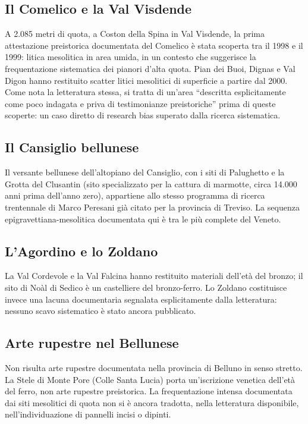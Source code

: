 \subsection{Il Comelico e la Val Visdende}

A 2.085 metri di quota, a Coston della Spina in Val Visdende, la prima attestazione preistorica documentata del Comelico è stata scoperta tra il 1998 e il 1999: litica mesolitica in area umida, in un contesto che suggerisce la frequentazione sistematica dei pianori d'alta quota. Pian dei Buoi, Dignas e Val Digon hanno restituito scatter litici mesolitici di superficie a partire dal 2000. Come nota la letteratura stessa, si tratta di un'area ``descritta esplicitamente come poco indagata e priva di testimonianze preistoriche'' prima di queste scoperte: un caso diretto di research bias superato dalla ricerca sistematica.

\subsection{Il Cansiglio bellunese}

Il versante bellunese dell'altopiano del Cansiglio, con i siti di Palughetto e la Grotta del Clusantin (sito specializzato per la cattura di marmotte, circa 14.000 anni prima dell'anno zero), appartiene allo stesso programma di ricerca trentennale di Marco Peresani già citato per la provincia di Treviso. La sequenza epigravettiana-mesolitica documentata qui è tra le più complete del Veneto.

\subsection{L'Agordino e lo Zoldano}

La Val Cordevole e la Val Falcina hanno restituito materiali dell'età del bronzo; il sito di Noàl di Sedico è un castelliere del bronzo-ferro. Lo Zoldano costituisce invece una lacuna documentaria segnalata esplicitamente dalla letteratura: nessuno scavo sistematico è stato ancora pubblicato.

\subsection{Arte rupestre nel Bellunese}

Non risulta arte rupestre documentata nella provincia di Belluno in senso stretto. La Stele di Monte Pore (Colle Santa Lucia) porta un'iscrizione venetica dell'età del ferro, non arte rupestre preistorica. La frequentazione intensa documentata dai siti mesolitici di quota non si è ancora tradotta, nella letteratura disponibile, nell'individuazione di pannelli incisi o dipinti.


